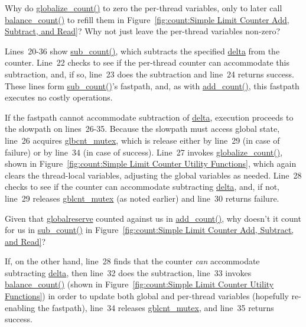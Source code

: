 \QuickQuiz{}
	Why do \url{globalize_count()} to zero the per-thread variables,
	only to later call \url{balance_count()} to refill them in
	Figure~\ref{fig:count:Simple Limit Counter Add, Subtract, and Read}?
	Why not just leave the per-thread variables non-zero?
 \QuickQuizEnd

Lines~20-36 show \url{sub_count()}, which subtracts the specified
\url{delta} from the counter.
Line~22 checks to see if the per-thread counter can accommodate
this subtraction, and, if so, line~23 does the subtraction and
line~24 returns success.
These lines form \url{sub_count()}'s fastpath, and, as with
\url{add_count()}, this fastpath executes no costly operations.

If the fastpath cannot accommodate subtraction of \url{delta},
execution proceeds to the slowpath on lines~26-35.
Because the slowpath must access global state, line~26
acquires \url{glbcnt_mutex}, which is release either by line~29
(in case of failure) or by line~34 (in case of success).
Line~27 invokes \url{globalize_count()}, shown in
Figure~\ref{fig:count:Simple Limit Counter Utility Functions},
which again clears the thread-local variables, adjusting the global variables
as needed.
Line~28 checks to see if the counter can accommodate subtracting
\url{delta}, and, if not, line~29 releases \url{gblcnt_mutex}
(as noted earlier) and line~30 returns failure.

\QuickQuiz{}
	Given that \url{globalreserve} counted against us in \url{add_count()},
	why doesn't it count for us in \url{sub_count()} in
	Figure~\ref{fig:count:Simple Limit Counter Add, Subtract, and Read}?
 \QuickQuizEnd

If, on the other hand, line~28 finds that the counter \emph{can}
accommodate subtracting \url{delta}, then line~32 does the subtraction,
line~33 invokes \url{balance_count()} (shown in
Figure~\ref{fig:count:Simple Limit Counter Utility Functions})
in order to update both global and per-thread variables
(hopefully re-enabling the fastpath),
line~34 releases \url{gblcnt_mutex}, and line~35 returns success.

